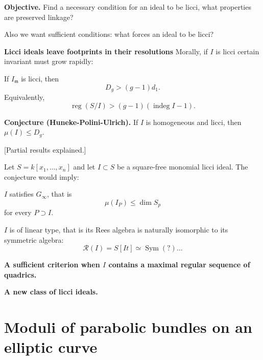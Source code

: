 \medskip\noindent
{\bf Objective.} Find a necessary condition
for an ideal to be licci, what properties
are preserved linkage?

Also we want sufficient conditions: what
forces an ideal to be licci?

\medskip\noindent
{\bf Licci ideals leave footprints
in their resolutions}
Morally, if $I$ is licci certain invariant
must grow rapidly:

\begin{theorem}
\label{theorem-hu}
If $I_{\mathfrak{m}}$ is licci, then
$$
D_g > (g-1)d_1.
$$
Equivalently,
$$
\operatorname{reg}(S/I)>
(g-1)(\operatorname{indeg}I-1).
$$
\end{theorem}

\medskip\noindent
{\bf Conjecture (Huneke-Polini-Ulrich).}
If $I$ is homogeneous and licci, then 
$\mu(I) \leq D_g$. 

[Partial results explained.]

Let $S = k[x_1,…,x_n]$ and let $I \subset S$
be a square-free monomial licci ideal.
The conjecture would imply:

\begin{corollary}
\label{lemma-coro-conj1}
$I$ satisfies $G_{\infty}$,
that is
$$
\mu(I_P)\leq  \dim S_p
$$
for every $P \supset I$.
\end{corollary}

\begin{corollary}
\label{lemma-coro-conj2}
$I$ is of linear type, that is
its Rees algebra is naturally isomorphic
to its symmetric algebra:
$$
\mathcal{R}(I) = S[It]
\simeq \operatorname{Sym} (?)…
$$
\end{corollary}

\medskip\noindent
{\bf A sufficient criterion when $I$
contains a maximal regular sequence
of quadrics.}

\begin{theorem}
\label{theorem-hpu}

\end{theorem}

\medskip\noindent
{\bf A new class of licci ideals.}

\begin{theorem}
\label{theorem-pu}

\end{theorem}




\section{Moduli of parabolic bundles on an
elliptic curve}
\label{section-parabolic-bundles-elliptic}

